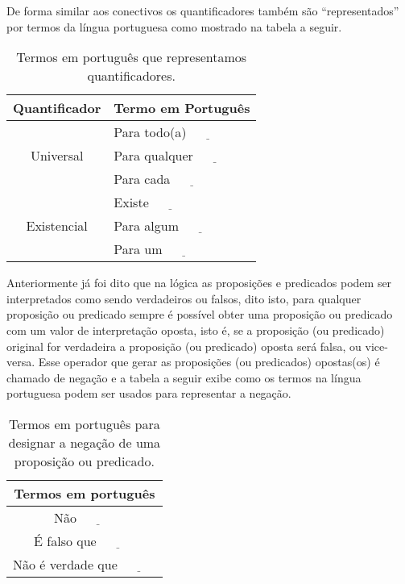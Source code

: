 De forma similar aos conectivos os quantificadores também são ``representados'' por termos da língua portuguesa como mostrado na tabela a seguir.

\begin{table}[h]
	\centering
	\scriptsize
	\begin{tabular}{cl}
		\hline
		\textbf{Quantificador}  & \textbf{Termo em Portugu\^es} \\ \hline
		\multirow{3}{*}{Universal}    & Para todo(a) $\underline{ \ \ \ \ \ \ \ \ \ \ \ \ }$\\
		& Para qualquer $\underline{ \ \ \ \ \ \ \ \ \ \ \ \ }$\\
		& Para cada $\underline{ \ \ \ \ \ \ \ \ \ \ \ \ }$\\ \hline
		\multirow{3}{*}{Existencial} & Existe $\underline{ \ \ \ \ \ \ \ \ \ \ \ \ }$\\
		& Para algum $\underline{ \ \ \ \ \ \ \ \ \ \ \ \ }$\\
		& Para um $\underline{ \ \ \ \ \ \ \ \ \ \ \ \ }$\\ \hline
	\end{tabular}
	\caption{Termos em português que representamos quantificadores.}
	\label{tab:QuantificadoresPT-BR}
\end{table}

Anteriormente já foi dito que na lógica as proposições e predicados podem ser interpretados como sendo verdadeiros ou falsos, dito isto, para qualquer proposição ou predicado sempre é possível obter uma proposição ou predicado com um valor de interpretação oposta, isto é, se a proposição (ou predicado) original for verdadeira a proposição (ou predicado) oposta será falsa, ou vice-versa. Esse operador que gerar as proposições (ou predicados) opostas(os) é chamado de negação e a tabela a seguir exibe como os termos na língua portuguesa podem ser usados para representar a negação.

\begin{table}[h]
	\scriptsize
	\centering
	\begin{tabular}{c}
		\hline
		Termos em português\\
		\hline
		Não $\underline{ \ \ \ \ \ \ \ \ \ \ \ \ }$ \\
		É falso que $\underline{ \ \ \ \ \ \ \ \ \ \ \ \ }$\\
		Não é verdade que $\underline{ \ \ \ \ \ \ \ \ \ \ \ \ }$ \\ \hline
	\end{tabular}
	\caption{Termos em português para designar a negação de uma proposição ou predicado.}
	\label{tab:NegacaoPortugues}
\end{table}

